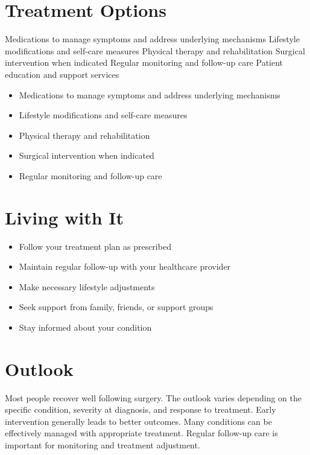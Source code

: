 \section{Treatment Options}
Medications to manage symptoms and address underlying mechanisms Lifestyle modifications and self-care measures Physical therapy and rehabilitation Surgical intervention when indicated Regular monitoring and follow-up care Patient education and support services

\begin{itemize}[noitemsep]
  \item Medications to manage symptoms and address underlying mechanisms
  \item Lifestyle modifications and self-care measures
  \item Physical therapy and rehabilitation
  \item Surgical intervention when indicated
  \item Regular monitoring and follow-up care
\end{itemize}
\section{Living with It}
\begin{itemize}[noitemsep]
  \item Follow your treatment plan as prescribed
  \item Maintain regular follow-up with your healthcare provider
  \item Make necessary lifestyle adjustments
  \item Seek support from family, friends, or support groups
  \item Stay informed about your condition
\end{itemize}
\section{Outlook}
Most people recover well following surgery. The outlook varies depending on the specific condition, severity at diagnosis, and response to treatment. Early intervention generally leads to better outcomes. Many conditions can be effectively managed with appropriate treatment. Regular follow-up care is important for monitoring and treatment adjustment.

